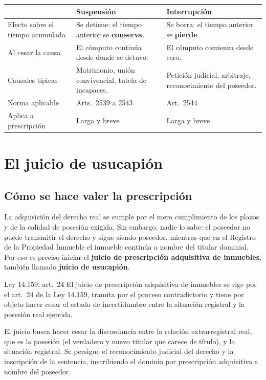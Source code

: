 \documentclass[12pt,oneside]{book}
\begin{document}
\begin{table}[H]
\centering
\begin{tabularx}{\textwidth}{@{}>{\raggedright\arraybackslash}p{}>{\raggedright\arraybackslash}X>{\raggedright\arraybackslash}X@{}}
\toprule
 & \textbf{Suspensión} & \textbf{Interrupción} \\
\midrule
Efecto sobre el tiempo acumulado & Se detiene: el tiempo anterior se \textbf{conserva}. & Se borra: el tiempo anterior se \textbf{pierde}. \\
Al cesar la causa & El cómputo continúa desde donde se detuvo. & El cómputo comienza desde cero. \\
Causales típicas & Matrimonio, unión convivencial, tutela de incapaces. & Petición judicial, arbitraje, reconocimiento del poseedor. \\
Norma aplicable & Arts.~2539 a 2543 & Art.~2544 \\
Aplica a prescripción & Larga y breve & Larga y breve \\
\bottomrule
\end{tabularx}
\end{table}

\section{El juicio de usucapión}

\subsection{Cómo se hace valer la prescripción}

La adquisición del derecho real se cumple por el mero cumplimiento de los plazos y de la calidad de posesión exigida. Sin embargo, nadie lo sabe: el poseedor no puede transmitir el derecho y sigue siendo poseedor, mientras que en el Registro de la Propiedad Inmueble el inmueble continúa a nombre del titular dominial. Por eso es preciso iniciar el \textbf{juicio de prescripción adquisitiva de inmuebles}, también llamado \textbf{juicio de usucapión}.

\begin{regla}{Ley 14.159, art.~24}
El juicio de prescripción adquisitiva de inmuebles se rige por el art.~24 de la Ley 14.159, tramita por el proceso contradictorio y tiene por objeto hacer cesar el estado de incertidumbre entre la situación registral y la posesión real ejercida.
\end{regla}

El juicio busca hacer cesar la discordancia entre la relación extrarregistral real, que es la posesión (el verdadero y nuevo titular que carece de título), y la situación registral. Se persigue el reconocimiento judicial del derecho y la inscripción de la sentencia, inscribiendo el dominio por prescripción adquisitiva a nombre del poseedor.
\end{document}
